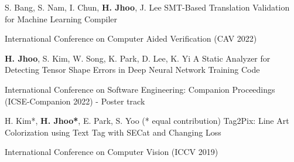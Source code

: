 

\begin{cventries}
  \cvpub
  {S. Bang, S. Nam, I. Chun, \textbf{H. Jhoo}, J. Lee} %
  {SMT-Based Translation Validation for Machine Learning Compiler} %
  {} %
  {} %
  {
    \begin{cvitems} %
      \item International Conference on Computer Aided Verification (CAV 2022)
    \end{cvitems}
  }

  \cvpub
  {\textbf{H. Jhoo}, S. Kim, W. Song, K. Park, D. Lee, K. Yi} %
  {A Static Analyzer for Detecting Tensor Shape Errors in Deep Neural Network Training Code} %
  {} %
  {} %
  {
    \begin{cvitems} %
      \item International Conference on Software Engineering: Companion Proceedings (ICSE-Companion 2022) - Poster track
    \end{cvitems}
  }


  \cvpub
  {H. Kim*, \textbf{H. Jhoo*}, E. Park, S. Yoo (* equal contribution)} %
  {Tag2Pix: Line Art Colorization using Text Tag with SECat and Changing Loss} %
  {} %
  {} %
  {
    \begin{cvitems} %
      \item International Conference on Computer Vision (ICCV 2019)
    \end{cvitems}
  }


\end{cventries}
